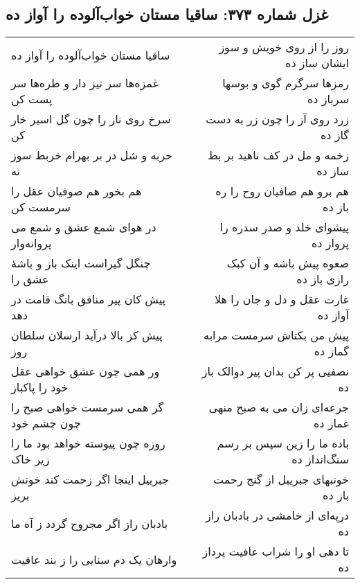 \begin{center}
\section*{غزل شماره ۳۷۳: ساقیا مستان خواب‌آلوده را آواز ده}
\label{sec:373}
\begin{longtable}{l p{0.5cm} r}
ساقیا مستان خواب‌آلوده را آواز ده
&&
روز را از روی خویش و سوز ایشان ساز ده
\\
غمزه‌ها سر تیز دار و طره‌ها سر پست کن
&&
رمزها سرگرم گوی و بوسها سرباز ده
\\
سرخ روی ناز را چون گل اسیر خار کن
&&
زرد روی آز را چون زر به دست گاز ده
\\
حربه و شل در بر بهرام خربط سوز نه
&&
زخمه و مل در کف ناهید بر بط ساز ده
\\
هم بخور هم صوفیان عقل را سرمست کن
&&
هم برو هم صافیان روح را ره باز ده
\\
در هوای شمع عشق و شمع می پروانه‌وار
&&
پیشوای خلد و صدر سدره را پرواز ده
\\
چنگل گیراست اینک باز و باشهٔ عشق را
&&
صعوه پیش باشه و آن کبک رازی باز ده
\\
پیش کان پیر منافق بانگ قامت در دهد
&&
غارت عقل و دل و جان را هلا آواز ده
\\
پیش کز بالا درآید ارسلان سلطان روز
&&
پیش من بکتاش سرمست مرابه گماز ده
\\
ور همی چون عشق خواهی عقل خود را پاکباز
&&
نصفیی پر کن بدان پیر دوالک باز ده
\\
گر همی سرمست خواهی صبح را چون چشم خود
&&
جرعه‌ای زان می به صبح منهی غماز ده
\\
روزه چون پیوسته خواهد بود ما را زیر خاک
&&
باده ما را زین سپس بر رسم سنگ‌انداز ده
\\
جبرییل اینجا اگر زحمت کند خونش بریز
&&
خونبهای جبرییل از گنج رحمت باز ده
\\
بادبان راز اگر مجروح گردد ز آه ما
&&
درپه‌ای از خامشی در بادبان راز ده
\\
وارهان یک دم سنایی را ز بند عافیت
&&
تا دهی او را شراب عافیت پرداز ده
\\
\end{longtable}
\end{center}
